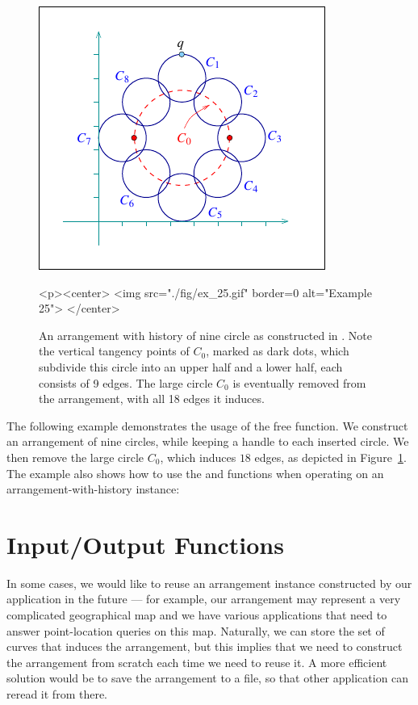 \begin{figure}[!htp]
\begin{ccTexOnly}
  \begin{center}
  \includegraphics{Arrangement_2/fig/ex_25}
  \end{center}
\end{ccTexOnly}
\begin{ccHtmlOnly}
  <p><center>
  <img src="./fig/ex_25.gif" border=0 alt="Example 25">
  </center>
\end{ccHtmlOnly}
\caption{An arrangement with history of nine circle as constructed in 
. Note the vertical tangency points
of $C_0$, marked as dark dots, which subdivide this circle into an upper half
and a lower half, each consists of 9 edges. The large circle $C_0$ is
eventually removed from the arrangement, with all 18 edges it induces.}
\label{arr_fig:ex_25}
\end{figure}

The following example demonstrates the usage of the free 
function. We construct an arrangement of nine circles, while keeping a handle
to each inserted circle. We then remove the large circle $C_0$, which induces
$18$ edges, as depicted in Figure~\ref{arr_fig:ex_25}. The example also shows
how to use the  and  functions when
operating on an arrangement-with-history instance:


\section{Input/Output Functions}
\label{arr_sec:io}
%
In some cases, we would like to reuse an arrangement instance constructed
by our application in the future --- for example, our arrangement may
represent a very complicated geographical map and we have various
applications that need to answer point-location queries on this map.
Naturally, we can store the set of curves that induces the arrangement,
but this implies that we need to construct the arrangement from
scratch each time we need to reuse it. A more efficient solution would
be to save the arrangement to a file, so that other application can
reread it from there.

